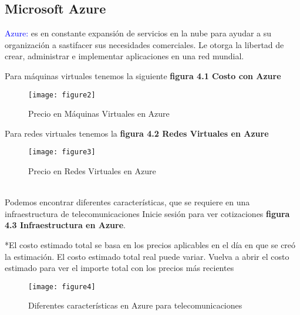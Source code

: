 \subsection{Microsoft Azure}

\textcolor{blue}{Azure:} es en constante expansión de servicios en la nube para ayudar a su organización a sastifacer sus necesidades comerciales. Le otorga la libertad de crear, administrar e implementar aplicaciones en una red mundial.

Para máquinas virtuales tenemos la siguiente \textbf{figura 4.1 Costo con Azure}

\begin{figure}[htbp]
  \centering
    {\texttt{[image: figure2]}}%
  \caption{Precio en Máquinas Virtuales en Azure}
  \label{fig:fig2subfig}
\end{figure}
Para redes virtuales tenemos la \textbf{figura 4.2 Redes Virtuales en Azure}
\begin{figure}[htbp]
  \centering
    {\texttt{[image: figure3]}}%
  \caption{Precio en Redes Virtuales en Azure}
  \label{fig:fig2subfig}
\end{figure}
%
\\
Podemos encontrar diferentes características, que se requiere en una infraestructura de telecomunicaciones 
Inicie sesión para ver cotizaciones  \textbf{figura 4.3 Infraestructura en Azure}.

*El costo estimado total se basa en los precios aplicables en el día en que se creó la estimación. El costo estimado total real puede variar. Vuelva a abrir el costo estimado para ver el importe total con los precios más recientes
\\
\begin{figure}[htbp]
  \centering
    {\texttt{[image: figure4]}}%
  \caption{Diferentes características en Azure para telecomunicaciones}
  \label{fig:fig2subfig}
\end{figure}



